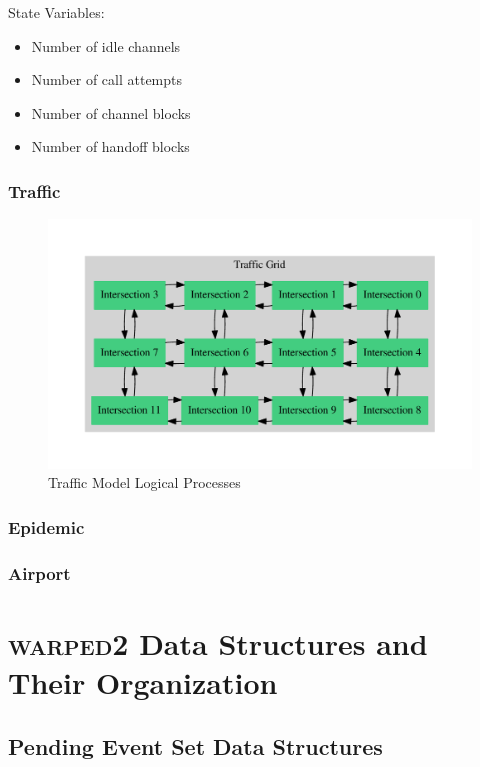 \documentclass[11pt]{book}
\begin{document}
State Variables:
\begin{itemize}
    \item Number of idle channels
    \item Number of call attempts
    \item Number of channel blocks
    \item Number of handoff blocks
\end{itemize}

\subsection{Traffic}

\begin{figure}[H]
    \centering
    \includegraphics[width=\textwidth]{figs/graphviz/traffic_model.pdf}
    \caption{Traffic Model Logical Processes}\label{traffic_model_lps}
\end{figure}

\subsection{Epidemic}

\subsection{Airport}



\chapter{\textsc{warped2} Data Structures and Their Organization}\label{warped2_ds}

\section{Pending Event Set Data Structures}
\end{document}

